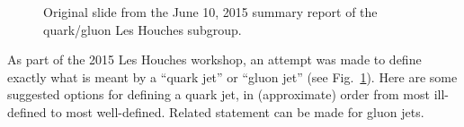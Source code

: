 \documentclass[11pt]{cernrep}
\begin{document}
\begin{figure}
\centering
{}
\caption{Original slide from the June 10, 2015 summary report of the quark/gluon Les Houches subgroup.}
\label{quarkgluon_fig:summary_slide}
\end{figure}

As part of the 2015 Les Houches workshop, an attempt was made to
define exactly what is meant by a ``quark jet'' or ``gluon jet'' (see Fig.~\ref{quarkgluon_fig:summary_slide}).
Here are some suggested options for defining a quark jet, in
(approximate) order from most ill-defined to most well-defined.
Related statement can be made for gluon jets.
\end{document}
